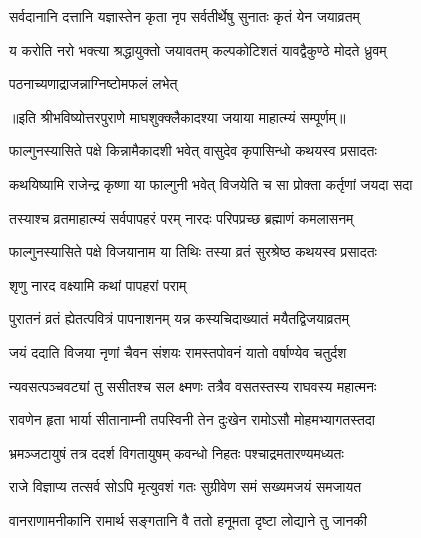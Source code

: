 \twolineshloka
{सर्वदानानि दत्तानि यज्ञास्तेन कृता नृप}
{सर्वतीर्थेषु सुनातः कृतं येन जयाव्रतम्} %

\twolineshloka
{य करोति नरो भक्त्या श्रद्धायुक्तो जयावतम्}
{कल्पकोटिशतं यावद्वैकुण्ठे मोदते ध्रुवम्} %

\onelineshloka
{पठनाच्यणाद्राजन्नाग्निष्टोमफलं लभेत्} %

॥इति श्रीभविष्योत्तरपुराणे माघशुक्क्लैकादश्या जयाया माहात्म्यं सम्पूर्णम्॥


\hyperref[sec:ekadashi_mahatmyam_vrata_raja]{\closesub}
\clearpage

\label{sec:vrata-raja-phalguna-krishna-vijaya}


\twolineshloka
{फाल्गुनस्यासिते पक्षे किन्नामैकादशी भवेत्}
{वासुदेव कृपासिन्धो कथयस्व प्रसादतः} %


\twolineshloka
{कथयिष्यामि राजेन्द्र कृष्णा या फाल्गुनी भवेत्}
{विजयेति च सा प्रोक्ता कर्तृणां जयदा सदा} %

\twolineshloka
{तस्याश्च व्रतमाहात्म्यं सर्वपापहरं परम्}
{नारदः परिपप्रच्छ ब्रह्माणं कमलासनम्} %

\twolineshloka
{फाल्गुनस्यासिते पक्षे विजयानाम या तिथिः}
{तस्या व्रतं सुरश्रेष्ठ कथयस्व प्रसादतः} %



\onelineshloka
{शृणु नारद वक्ष्यामि कथां पापहरां पराम्} %

\twolineshloka
{पुरातनं व्रतं ह्येतत्पवित्रं पापनाशनम्}
{यन्न कस्यचिदाख्यातं मयैतद्विजयाव्रतम्} %

\twolineshloka
{जयं ददाति विजया नृणां चैवन संशयः}
{रामस्तपोवनं यातो वर्षाण्येव चतुर्दश} %

\twolineshloka
{न्यवसत्पञ्चवट्यां तु ससीतश्च सल क्ष्मणः}
{तत्रैव वसतस्तस्य राघवस्य महात्मनः} %

\twolineshloka
{रावणेन हृता भार्या सीतानाम्नी तपस्विनी}
{तेन दुःखेन रामोऽसौ मोहमभ्यागतस्तदा} %

\twolineshloka
{भ्रमञ्जटायुषं तत्र ददर्श विगतायुषम्}
{कवन्धो निहतः पश्चाद्रमतारण्यमध्यतः} %

\twolineshloka
{राजे विज्ञाप्य तत्सर्व सोऽपि मृत्युवशं गतः}
{सुग्रीवेण समं सख्यमजयं समजायत} %

\twolineshloka
{वानराणामनीकानि रामार्थ सङ्गतानि वै}
{ततो हनूमता दृष्टा लोद्याने तु जानकी} %

